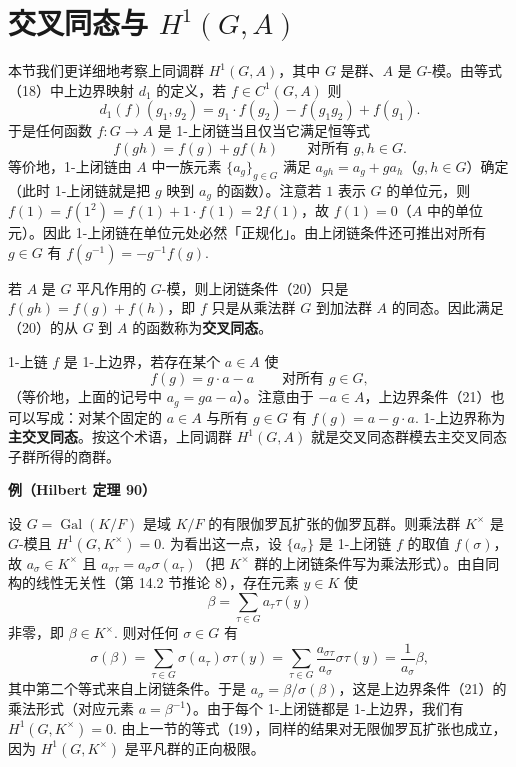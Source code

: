 \section{交叉同态与 \(H^1(G,A)\)}

本节我们更详细地考察上同调群 \(H^1(G, A)\)，其中 \(G\) 是群、\(A\) 是 \(G\)-模。由等式（18）中上边界映射 \(d_1\) 的定义，若 \(f \in C^1(G, A)\) 则
\[
d_1(f)(g_1, g_2) = g_1 \cdot f(g_2)-f(g_1g_2)+f(g_1).
\]
于是任何函数 \(f : G \to A\) 是 1-上闭链当且仅当它满足恒等式
\[
f(gh) = f(g)+gf(h) \qquad \text{对所有 } g, h \in G. \tag{17.20}
\]
等价地，1-上闭链由 \(A\) 中一族元素 \(\{a_g\}_{g \in G}\) 满足 \(a_{gh} = a_g+ga_h\)（\(g, h \in G\)）确定（此时 1-上闭链就是把 \(g\) 映到 \(a_g\) 的函数）。注意若 \(1\) 表示 \(G\) 的单位元，则 \(f(1) = f(1^2) = f(1)+1 \cdot f(1) = 2f(1)\)，故 \(f(1) = 0\)（\(A\) 中的单位元）。因此 1-上闭链在单位元处必然「正规化」。由上闭链条件还可推出对所有 \(g \in G\) 有 \(f(g^{-1}) = -g^{-1}f(g)\).

若 \(A\) 是 \(G\) 平凡作用的 \(G\)-模，则上闭链条件（20）只是 \(f(gh) = f(g)+f(h)\)，即 \(f\) 只是从乘法群 \(G\) 到加法群 \(A\) 的同态。因此满足（20）的从 \(G\) 到 \(A\) 的函数称为\textbf{交叉同态}。

1-上链 \(f\) 是 1-上边界，若存在某个 \(a \in A\) 使
\[
f(g) = g \cdot a-a \qquad \text{对所有 } g \in G, \tag{17.21}
\]
（等价地，上面的记号中 \(a_g = ga-a\)）。注意由于 \(-a \in A\)，上边界条件（21）也可以写成：对某个固定的 \(a \in A\) 与所有 \(g \in G\) 有 \(f(g) = a-g \cdot a\). 1-上边界称为\textbf{主交叉同态}。按这个术语，上同调群 \(H^1(G, A)\) 就是交叉同态群模去主交叉同态子群所得的商群。

\noindent\textbf{例（Hilbert 定理 90）}

设 \(G = \operatorname{Gal}(K/F)\) 是域 \(K/F\) 的有限伽罗瓦扩张的伽罗瓦群。则乘法群 \(K^\times\) 是 \(G\)-模且 \(H^1(G, K^\times) = 0\). 为看出这一点，设 \(\{a_\sigma\}\) 是 1-上闭链 \(f\) 的取值 \(f(\sigma)\)，故 \(a_\sigma \in K^\times\) 且 \(a_{\sigma\tau} = a_\sigma\sigma(a_\tau)\)（把 \(K^\times\) 群的上闭链条件写为乘法形式）。由自同构的线性无关性（第 14.2 节推论 8），存在元素 \(y \in K\) 使
\[
\beta = \sum_{\tau \in G}a_\tau\tau(y)
\]
非零，即 \(\beta \in K^\times\). 则对任何 \(\sigma \in G\) 有
\[
\sigma(\beta) = \sum_{\tau \in G}\sigma(a_\tau)\sigma\tau(y) = \sum_{\tau \in G}\frac{a_{\sigma\tau}}{a_\sigma}\sigma\tau(y) = \frac{1}{a_\sigma}\beta,
\]
其中第二个等式来自上闭链条件。于是 \(a_\sigma = \beta/\sigma(\beta)\)，这是上边界条件（21）的乘法形式（对应元素 \(a = \beta^{-1}\)）。由于每个 1-上闭链都是 1-上边界，我们有 \(H^1(G, K^\times) = 0\). 由上一节的等式（19），同样的结果对无限伽罗瓦扩张也成立，因为 \(H^1(G, K^\times)\) 是平凡群的正向极限。

